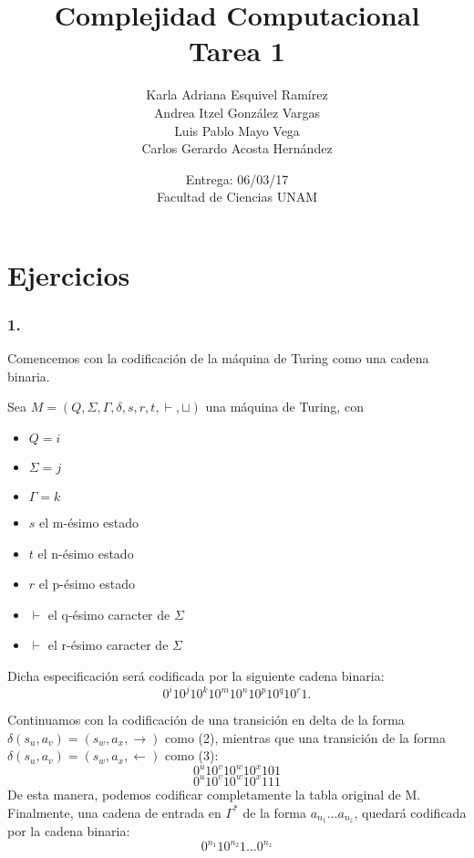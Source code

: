 \documentclass[12pt]{article}
\title{Complejidad Computacional \\ Tarea 1}
\author{Karla Adriana Esquivel Ramírez \\ Andrea Itzel González Vargas\\ Luis Pablo Mayo Vega \\ Carlos Gerardo Acosta Hernández}
\date{Entrega: 06/03/17 \\ Facultad de Ciencias UNAM}
\begin{document}
\maketitle
\section*{Ejercicios}
\subsubsection*{1.}
Comencemos con la codificación de la máquina de Turing como una cadena binaria.

Sea $M = (Q,\Sigma,\Gamma,\delta,s,r,t,\vdash,\sqcup)$ una máquina de Turing, con
\begin{itemize}
\item $Q = i$
\item $\Sigma = j$
\item $\Gamma = k$
\item $s$ el m-ésimo estado
\item $t$ el n-ésimo estado
\item $r$ el p-ésimo estado
\item $\vdash$ el q-ésimo caracter de $\Sigma$
\item $\vdash$ el r-ésimo caracter de $\Sigma$ 
\end{itemize}
Dicha especificación será codificada por la siguiente cadena binaria:\\
\begin{equation}
  0^i10^j10^k10^m10^n10^p10^q10^r1.
\end{equation}

Continuamos con la codificación de una transición en delta de la forma $\delta(s_u,a_v) = (s_w,a_x,\rightarrow)$ como (2),
mientras que una transición de la forma $\delta(s_u,a_v) = (s_w,a_x,\leftarrow)$ como (3):\\
\begin{equation}
  0^u10^v10^w10^x101
\end{equation}
\begin{equation}
  0^u10^v10^w10^x111  
\end{equation}
De esta manera, podemos codificar completamente la tabla original de M.\\
Finalmente, una cadena de entrada en $\Gamma^*$ de la forma $a_{n_1} \dots a_{n_z}$, quedará codificada por la cadena binaria:\\
\begin{equation}
0^{n_1}10^{n_2}1\dots0^{n_z}
\end{equation}
\end{document}
